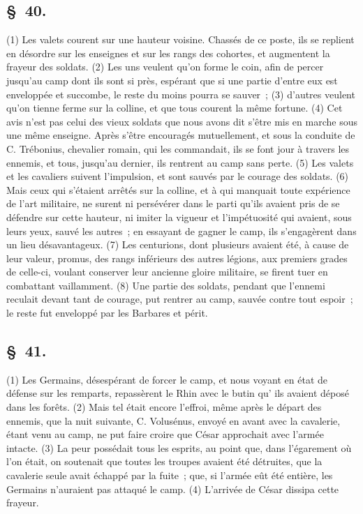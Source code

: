 \documentclass[french,twoside]{book} %
\begin{document}
\subsection[{§ 40.}]{ \textsc{§ 40.} }
\noindent (1) Les valets courent sur une hauteur voisine. Chassés de ce poste, ils se replient en désordre sur les enseignes et sur les rangs des cohortes, et augmentent la frayeur des soldats. (2) Les uns veulent qu’on forme le coin, afin de percer jusqu’au camp dont ils sont si près, espérant que si une partie d’entre eux est enveloppée et succombe, le reste du moins pourra se sauver ; (3) d’autres veulent qu’on tienne ferme sur la colline, et que tous courent la même fortune. (4) Cet avis n’est pas celui des vieux soldats que nous avons dit s’être mis en marche sous une même enseigne. Après s’être encouragés mutuellement, et sous la conduite de C. Trébonius, chevalier romain, qui les commandait, ils se font jour à travers les ennemis, et tous, jusqu’au dernier, ils rentrent au camp sans perte. (5) Les valets et les cavaliers suivent l’impulsion, et sont sauvés par le courage des soldats. (6) Mais ceux qui s’étaient arrêtés sur la colline, et à qui manquait toute expérience de l’art militaire, ne surent ni persévérer dans le parti qu’ils avaient pris de se défendre sur cette hauteur, ni imiter la vigueur et l’impétuosité qui avaient, sous leurs yeux, sauvé les autres ; en essayant de gagner le camp, ils s’engagèrent dans un lieu désavantageux. (7) Les centurions, dont plusieurs avaient été, à cause de leur valeur, promus, des rangs inférieurs des autres légions, aux premiers grades de celle-ci, voulant conserver leur ancienne gloire militaire, se firent tuer en combattant vaillamment. (8) Une partie des soldats, pendant que l’ennemi reculait devant tant de courage, put rentrer au camp, sauvée contre tout espoir ; le reste fut enveloppé par les Barbares et périt.
\subsection[{§ 41.}]{ \textsc{§ 41.} }
\noindent (1) Les Germains, désespérant de forcer le camp, et nous voyant en état de défense sur les remparts, repassèrent le Rhin avec le butin qu’ ils avaient déposé dans les forêts. (2) Mais tel était encore l’effroi, même après le départ des ennemis, que la nuit suivante, C. Volusénus, envoyé en avant avec la cavalerie, étant venu au camp, ne put faire croire que César approchait avec l’armée intacte. (3) La peur possédait tous les esprits, au point que, dans l’égarement où l’on était, on soutenait que toutes les troupes avaient été détruites, que la cavalerie seule avait échappé par la fuite ; que, si l’armée eût été entière, les Germains n’auraient pas attaqué le camp. (4) L'arrivée de César dissipa cette frayeur.
\end{document}
